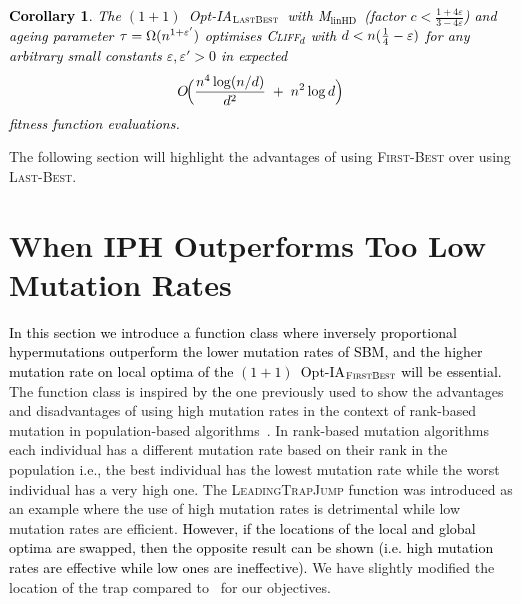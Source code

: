 \documentclass[lettersize,journal]{IEEEtran}
\newcommand{\new}[1]{\textcolor{black}{#1}}
\newcommand{\rev}[1]{\textcolor{black}{#1}}
\newcommand{\rerev}[1]{\textcolor{black}{#1}}
\newcommand{\cliff}{\textsc{Cliff}$_d$}
\newcommand{\linHD}{M$_{\text{linHD}}$}
\newcommand{\lastBest}{$(1+1)$~Opt-IA$_{\textsc{LastBest}}$}
\newtheorem{corollary}{Corollary}
\begin{document}
{\textcolor{black}{
\begin{corollary}
	The \textcolor{black}{\lastBest~with} \linHD\ \new{(factor $c<\tfrac{1+4\varepsilon}{3-4\varepsilon}$)} and ageing parameter $\tau=\Omega(n^{1+\rerev{\varepsilon'}})$
	optimises \cliff{} with $d<n(\tfrac{1}{4}-\rerev{\varepsilon})$ \rerev{for any arbitrary small constants $\varepsilon,\varepsilon'>0$} in expected
	\[
	O\!\Big(\frac{\rev{n^{4}}\log(n/d)}{d^{2}} \;+\; n^{2}\log d\Big)
	\]
	fitness function evaluations.
\end{corollary}
}
The following section will highlight the advantages of using \textsc{First-Best} over using \textsc{Last-Best}.
 }
 
 
 
\section{When IPH Outperforms Too Low Mutation Rates}\label{sec:ltj}
\new{In this section we introduce a function class where inversely proportional hypermutations outperform the lower mutation rates of SBM, and the higher mutation rate on local optima of the $(1+1)$~Opt-IA$_{\textsc{FirstBest}}$ will be essential.}
The function class is inspired \rev{by the} one previously used to show the advantages and disadvantages of using high mutation rates in the context of rank-based mutation in population-based algorithms~\cite{OlivetoLehreNeumann09}.
In rank-based mutation algorithms~\cite{RankBasedMutation} each individual has a different mutation rate based on their rank in the population i.e., the best individual has the lowest mutation rate while the worst individual has a very high one.
The \textsc{LeadingTrapJump} function was introduced as an example where the use of high mutation rates is detrimental while low mutation rates are efficient. \new{However, if the locations of the local and global optima are swapped, then the opposite result can be shown (i.e. high mutation rates are effective while low ones are ineffective).}
We have slightly modified the location of the trap compared to~\cite{OlivetoLehreNeumann09} for our objectives. 
\end{document}
